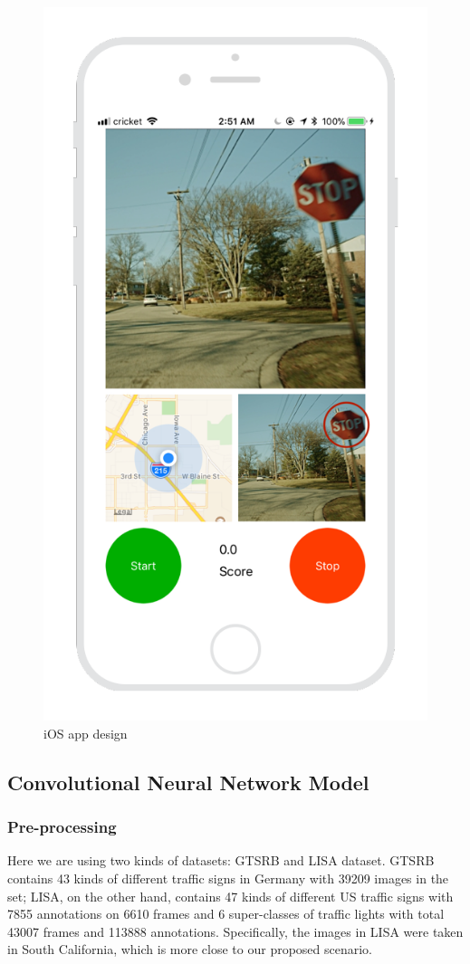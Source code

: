 \documentclass[conference]{IEEEtran}
\begin{document}
\begin{figure}[H]
  \begin{minipage}{.4\textwidth}
    \centering
    \includegraphics[width=0.6\linewidth]{iOS_design.png}
    \caption{iOS app design}
    \label{fig:fig_1}
  \end{minipage}
\end{figure}

\subsection{Convolutional Neural Network Model}

\subsubsection{Pre-processing}
Here we are using two kinds of datasets: GTSRB and LISA dataset. GTSRB contains 43 kinds of different traffic signs in Germany with 39209 images in the set; LISA, on the other hand, contains 47 kinds of different US traffic signs with 7855 annotations on 6610 frames and 6 super-classes of traffic lights with total 43007 frames and 113888 annotations. Specifically, the images in LISA were taken in South California, which is more close to our proposed scenario.
\end{document}
